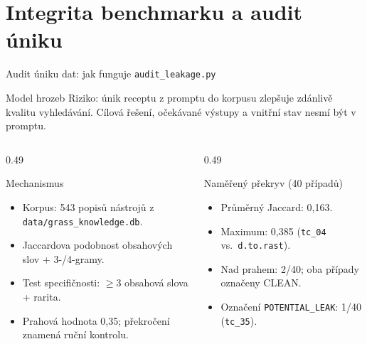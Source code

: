 \documentclass[aspectratio=169,10pt]{beamer}
\begin{document}
\section{Integrita benchmarku a audit úniku}

\begin{frame}[t]{Audit úniku dat: jak funguje \texttt{audit\_leakage.py}}
  \small
  \begin{alertblock}{Model hrozeb}
    Riziko: únik receptu z promptu do korpusu zlepšuje zdánlivě kvalitu
    vyhledávání. Cílová řešení, očekávané výstupy a vnitřní stav nesmí být
    v promptu.
  \end{alertblock}

  \begin{columns}[T,onlytextwidth]
    \begin{column}{0.49\textwidth}
      \begin{block}{Mechanismus}
        \begin{itemize}
          \item Korpus: 543 popisů nástrojů z
                \texttt{data/grass\_knowledge.db}.
          \item Jaccardova podobnost obsahových slov + 3-/4-gramy.
          \item Test specifičnosti: $\geq$3 obsahová slova + rarita.
          \item Prahová hodnota 0{,}35; překročení znamená ruční kontrolu.
        \end{itemize}
      \end{block}
    \end{column}
    \begin{column}{0.49\textwidth}
      \begin{block}{Naměřený překryv (40 případů)}
        \begin{itemize}
          \item Průměrný Jaccard: 0{,}163.
          \item Maximum: 0{,}385 (\texttt{tc\_04} vs.\ \texttt{d.to.rast}).
          \item Nad prahem: 2/40; oba případy označeny CLEAN.
          \item Označení \texttt{POTENTIAL\_LEAK}: 1/40 (\texttt{tc\_35}).
        \end{itemize}
      \end{block}
    \end{column}
  \end{columns}

\end{frame}
\end{document}

